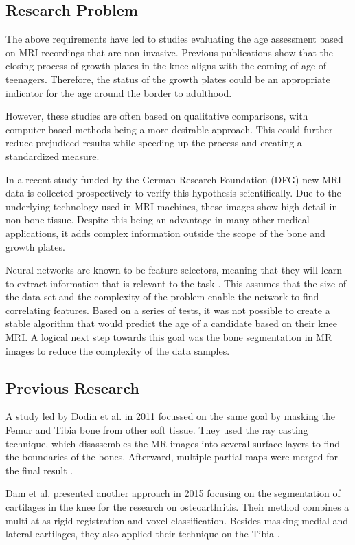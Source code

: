 \subsection{Research Problem}

The above requirements have led to studies evaluating the age assessment based on MRI recordings that are non-invasive. Previous publications \cite{Saring2014}\cite{Jopp2007} show that the closing process of growth plates in the knee aligns with the coming of age of teenagers. Therefore, the status of the growth plates could be an appropriate indicator for the age around the border to adulthood.

However, these studies are often based on qualitative comparisons, with computer-based methods being a more desirable approach. This could further reduce prejudiced results while speeding up the process and creating a standardized measure. 

In a recent study funded by the German Research Foundation (DFG) new MRI data is collected prospectively to verify this hypothesis scientifically. Due to the underlying technology used in MRI machines, these images show high detail in non-bone tissue. Despite this being an advantage in many other medical applications, it adds complex information outside the scope of the bone and growth plates.

Neural networks are known to be feature selectors, meaning that they will learn to extract information that is relevant to the task \cite{Setiono1997}. This assumes that the size of the data set and the complexity of the problem enable the network to find correlating features. Based on a series of tests, it was not possible to create a stable algorithm that would predict the age of a candidate based on their knee MRI. A logical next step towards this goal was the bone segmentation in MR images to reduce the complexity of the data samples.

\subsection{Previous Research}

A study led by Dodin et al. in 2011 focussed on the same goal by masking the Femur and Tibia bone from other soft tissue. They used the ray casting technique, which disassembles the MR images into several surface layers to find the boundaries of the bones. Afterward, multiple partial maps were merged for the final result \cite{Dodin2011}.

Dam et al. presented another approach in 2015 focusing on the segmentation of cartilages in the knee for the research on osteoarthritis. Their method combines a multi-atlas rigid registration and voxel classification. Besides masking medial and lateral cartilages, they also applied their technique on the Tibia \cite{Dam}.


